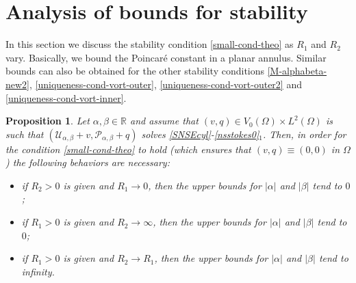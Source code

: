 \documentclass[a4paper,11pt]{amsart}
\newtheorem{proposition}{Proposition}[section]
\numberwithin{equation}{section}
\numberwithin{figure}{section}
\def\U{{\mathcal U}}
\def\P{{\mathcal P}}
\begin{document}
\section{Analysis of bounds for stability}

In this section we discuss the stability condition \eqref{small-cond-theo} as $R_1$ and $R_2$ vary.
Basically, we bound the Poincaré constant in a planar annulus. Similar bounds can also be obtained
for the other stability conditions \eqref{M-alphabeta-new2}, \eqref{uniqueness-cond-vort-outer}, \eqref{uniqueness-cond-vort-outer2} and \eqref{uniqueness-cond-vort-inner}.

\begin{proposition}\label{R1R2vary}
	Let $\alpha,\beta \in \mathbb{R}$ and assume that $(v, q)\in V_0(\Omega)\times L^2(\Omega)$ is such that $( \U_{\alpha,\beta}+v, \P_{\alpha,\beta}+q)$
	solves \eqref{SNSEcyl}-\eqref{nsstokes0}$_1$. Then, in order for the condition \eqref{small-cond-theo} to hold (which ensures that $(v,q)\equiv(0,0)$ in $\Omega$)
	the following behaviors are necessary:\smallskip 
    
    \begin{itemize}
	\item[$(i)$] if $R_2>0$ is given and $R_1\to0$, then the upper bounds for $|\alpha|$ and $|\beta|$ tend to $0$;
    
	\item [$(ii)$] if $R_1>0$ is given and $R_2\to\infty$, then the upper bounds for $|\alpha|$ and $|\beta|$ tend to $0$;
    
	\item [$(iii)$] if $R_1>0$ is given and $R_2\to R_1$, then the upper bounds for $|\alpha|$ and $|\beta|$ tend to infinity.
    \end{itemize}
\end{proposition}
\end{document}
